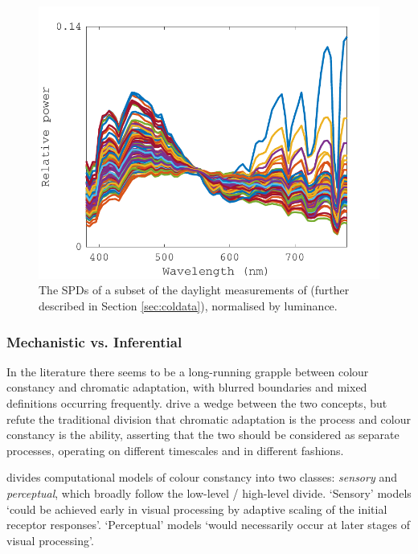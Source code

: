 \begin{figure}[htbp]
\includegraphics[max width=\textwidth]{figs/LitRev/ColorimetryDemo7.pdf}
\caption{The \glspl{SPD} of a subset of the daylight measurements of \citet{hernandez-andres_color_2001} (further described in Section \ref{sec:coldata}), normalised by luminance.}
\label{fig:SPDnorm}
\end{figure}

\subsubsection{Mechanistic vs. Inferential}

In the literature there seems to be a long-running grapple between colour constancy and chromatic adaptation, with blurred boundaries and mixed definitions occurring frequently. \citet{brill_chromatic_1986} drive a wedge between the two concepts, but refute the traditional division that chromatic adaptation is the process and colour constancy is the ability, asserting that the two should be considered as separate processes, operating on different timescales and in different fashions.

\citet{hurlbert_computational_1998} divides computational models of colour constancy into two classes: \emph{sensory} and \emph{perceptual}, which broadly follow the low-level / high-level divide. `Sensory' models `could be achieved early in visual processing by adaptive scaling of the initial receptor responses'. `Perceptual' models `would necessarily occur at later stages of visual processing'.

